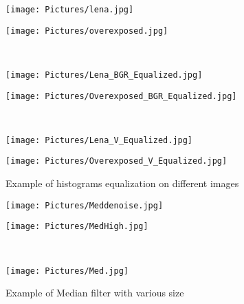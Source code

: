 \documentclass[11pt,a4paper]{article}
\begin{document}
\begin{figure}[htbp]
\centering
\begin{minipage}{\textwidth}
\begin{minipage}{0.4\textwidth}
  \centering
\texttt{[image: Pictures/lena.jpg]}
\end{minipage}%
\begin{minipage}{0.6\textwidth}
  \centering
\texttt{[image: Pictures/overexposed.jpg]}
\end{minipage}
\end{minipage}\\
\begin{minipage}{\textwidth}
\begin{minipage}{0.4\textwidth}
  \centering
\texttt{[image: Pictures/Lena\_BGR\_Equalized.jpg]}
\end{minipage}%
\begin{minipage}{0.6\textwidth}
  \centering
\texttt{[image: Pictures/Overexposed\_BGR\_Equalized.jpg]}
\end{minipage}
\end{minipage}\\
\begin{minipage}{\textwidth}
\begin{minipage}{0.4\textwidth}
  \centering
\texttt{[image: Pictures/Lena\_V\_Equalized.jpg]}
\end{minipage}%
\begin{minipage}{0.6\textwidth}
  \centering
\texttt{[image: Pictures/Overexposed\_V\_Equalized.jpg]}
\end{minipage}
\end{minipage}
\caption{Example of histograms equalization on different images} \label{fig:HistEq}
\end{figure}

\begin{figure}[htbp]
\centering
\begin{minipage}{0.5\textwidth}
  \centering
\texttt{[image: Pictures/Meddenoise.jpg]}
\label{fig:mednoise}
\end{minipage}%
\begin{minipage}{0.5\textwidth}
  \centering
\texttt{[image: Pictures/MedHigh.jpg]}
\end{minipage}\\
\begin{center}
\begin{minipage}{0.5\textwidth}
  \centering
\texttt{[image: Pictures/Med.jpg]}
  \end{minipage}
\end{center}
\caption{Example of Median filter with various size}
\end{figure}
\end{document}

